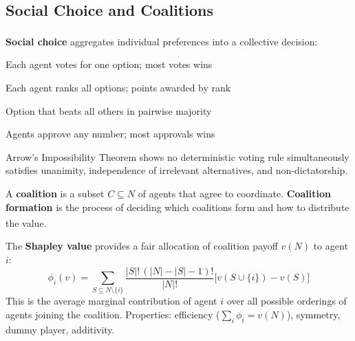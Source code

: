 \subsection{Social Choice and Coalitions}
\begin{tcbitemize}[ skin=sectionraster ]

    \tcbitem[title=Voting Mechanisms, raster multicolumn=3]
    \textbf{Social choice} aggregates individual preferences into a collective
    decision:\textsuperscript{\cite[][Ch.~9]{shohamMultiagentSystemsAlgorithmic2009}}
    \begin{description}[leftmargin=0.6cm, labelindent=0pt]
        \item[\textbf{Plurality}] Each agent votes for one option; most votes wins
        \item[\textbf{Borda count}] Each agent ranks all options; points awarded by rank
        \item[\textbf{Condorcet}] Option that beats all others in pairwise majority
        \item[\textbf{Approval voting}] Agents approve any number; most approvals wins
    \end{description}
    Arrow's Impossibility Theorem shows no deterministic voting rule simultaneously
    satisfies unanimity, independence of irrelevant alternatives, and non-dictatorship.

    \tcbitem[title=Coalition Formation and Shapley Value, raster multicolumn=3]
    A \textbf{coalition} is a subset $C \subseteq N$ of agents that agree to
    coordinate. \textbf{Coalition formation} is the process of deciding which
    coalitions form and how to distribute the
    value.\textsuperscript{\cite[][Ch.~12]{shohamMultiagentSystemsAlgorithmic2009}}

    The \textbf{Shapley value} provides a fair allocation of coalition payoff
    $v(N)$ to agent $i$:
    \begin{equation}
        \phi_i(v) = \sum_{S \subseteq N \setminus \{i\}}
        \frac{|S|!\,(|N|-|S|-1)!}{|N|!}
        \bigl[v(S \cup \{i\}) - v(S)\bigr]
    \end{equation}
    This is the average marginal contribution of agent $i$ over all possible
    orderings of agents joining the coalition.
    Properties: efficiency ($\sum_i \phi_i = v(N)$), symmetry, dummy player, additivity.

\end{tcbitemize}

